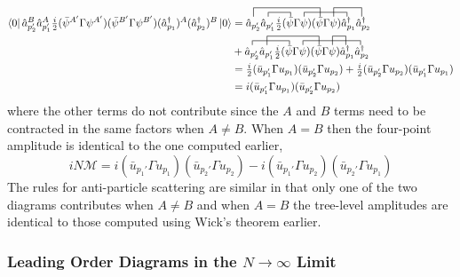 \documentclass[12pt]{article}
\newcommand{\bra}[1]{\left| #1 \right>}
\newcommand{\ket}[1]{\left| #1 \right>}
\renewcommand{\bra}[1]{\left< #1 \right|}
\renewcommand{\a}{\hat{a}}
\newcommand{\adag}{\hat{a}^\dagger}
\begin{document}
\begin{align*}
\bra{0} \a_{p_2'}^B \a_{p_1'}^A \tfrac{i}{2} ( \bar{\psi}^{A'} \Gamma \psi^{A'}) (\bar{\psi}^{B'} \Gamma \psi^{B'})(\adag_{p_1})^A(\adag_{p_2})^B \ket{0} & = 
\contraction{\a_{p_2'}}{ \a_{p_1'}}{\tfrac{i}{2} ( }{\bar{\psi}}
\contraction[2ex]{}{ \a_{p_2'} }{ \a_{p_1'} \tfrac{i}{2} ( \bar{\psi} \Gamma \psi) (} {\bar{\psi}} 
\contraction{\a_{p_2'} \a_{p_1'} \tfrac{i}{2} ( \bar{\psi} \Gamma}{ \psi}{) (\bar{\psi} \Gamma \psi)}{\adag}
\contraction[2ex]{\a_{p_2'} \a_{p_1'} \tfrac{i}{2} ( \bar{\psi} \Gamma \psi) (\bar{\psi} \Gamma}{ \psi }{)\adag_{p_1}}{ \adag}
\a_{p_2'} \a_{p_1'} \tfrac{i}{2} ( \bar{\psi} \Gamma \psi) (\bar{\psi} \Gamma \psi)\adag_{p_1} \adag_{p_2} 
\\
& + 
\contraction{}{ \a_{p_2'}}{ \a_{p_1'}\tfrac{i}{2} ( }{\bar{\psi}}
\contraction[2ex]{\a_{p_2'} }{ \a_{p_1'} }{ \tfrac{i}{2} ( \bar{\psi} \Gamma \psi) (} {\bar{\psi}} 
\contraction{\a_{p_2'} \a_{p_1'} \tfrac{i}{2} ( \bar{\psi} \Gamma}{ \psi}{) (\bar{\psi} \Gamma \psi) \adag_{p_1}}{\adag}
\contraction[2ex]{\a_{p_2'} \a_{p_1'} \tfrac{i}{2} ( \bar{\psi} \Gamma \psi) (\bar{\psi} \Gamma}{ \psi }{)}{\adag}
\a_{p_2'} \a_{p_1'} \tfrac{i}{2} ( \bar{\psi} \Gamma \psi) (\bar{\psi} \Gamma \psi)\adag_{p_1} \adag_{p_2} 
\\
& = \tfrac{i}{2} ( \bar{u}_{p_1'} \Gamma u_{p_1}) (\bar{u}_{p_2'} \Gamma u_{p_2}) + \tfrac{i}{2} ( \bar{u}_{p_2'} \Gamma u_{p_2}) (\bar{u}_{p_1'} \Gamma u_{p_1}) 
\\
& = i ( \bar{u}_{p_1'} \Gamma u_{p_1}) (\bar{u}_{p_2'} \Gamma u_{p_2})
\end{align*}
where the other terms do not contribute since the $A$ and $B$ terms need to be contracted in the same factors when $A \neq B$. When $A = B$ then the four-point amplitude is identical to the one computed earlier, 
\[ i N \mathcal{M} = i ( \bar{u}_{p_1'} \Gamma u_{p_1}) (\bar{u}_{p_2'} \Gamma u_{p_2}) - i ( \bar{u}_{p_1'} \Gamma u_{p_2}) (\bar{u}_{p_2'} \Gamma u_{p_1}) \]
The rules for anti-particle scattering are similar in that only one of the two diagrams contributes when $A \neq B$ and when $A = B$ the tree-level amplitudes are identical to those computed using Wick's theorem earlier. 


\subsubsection{Leading Order Diagrams in the $N \to \infty$ Limit}
\end{document}
